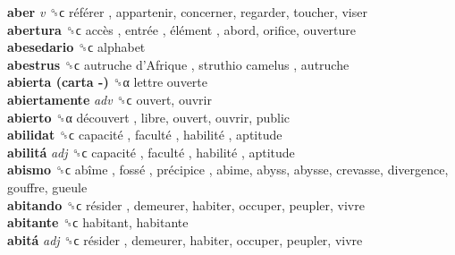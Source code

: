 \textbf{aber} \emph{v}  ␝ϲ   référer , appartenir, concerner, regarder, toucher, viser  \\
\textbf{abertura} ␝ϲ   accès ,  entrée ,  élément , abord, orifice, ouverture  \\
\textbf{abesedario} ␝ϲ  alphabet  \\
\textbf{abestrus} ␝ϲ   autruche d’Afrique ,  struthio camelus , autruche  \\
\textbf{abierta (carta -)} ␝α   lettre ouverte   \\
\textbf{abiertamente} \emph{adv}  ␝ϲ  ouvert, ouvrir  \\
\textbf{abierto} ␝α   découvert , libre, ouvert, ouvrir, public  \\
\textbf{abilidat} ␝ϲ   capacité ,  faculté ,  habilité , aptitude  \\
\textbf{abilitá} \emph{adj}  ␝ϲ   capacité ,  faculté ,  habilité , aptitude  \\
\textbf{abismo} ␝ϲ   abîme ,  fossé ,  précipice , abime, abyss, abysse, crevasse, divergence, gouffre, gueule  \\
\textbf{abitando} ␝ϲ   résider , demeurer, habiter, occuper, peupler, vivre  \\
\textbf{abitante} ␝ϲ  habitant, habitante  \\
\textbf{abitá} \emph{adj}  ␝ϲ   résider , demeurer, habiter, occuper, peupler, vivre  \\

